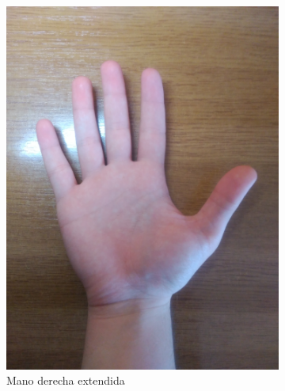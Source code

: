 \documentclass[a4paper,11pt]{article}
\begin{document}
\begin{figure}[!h]
	\centering
	\begin{subfigure}{0.48\textwidth}
		\centering
		\includegraphics[scale=0.066]{./Imagenes/trae_da_vinci1.jpg}
		\caption{Mano derecha extendida}
	\end{subfigure}
	\begin{subfigure}{0.48\textwidth}
		\centering

\end{subfigure}
\end{figure}
\end{document}

